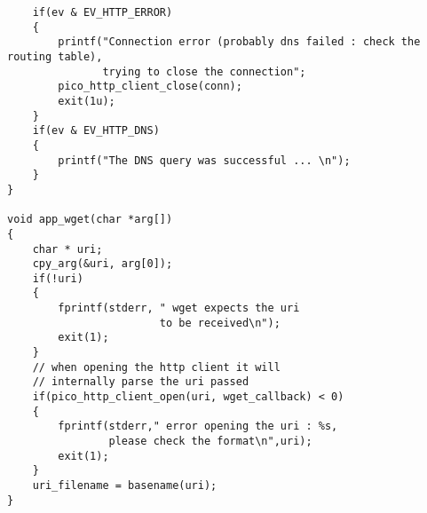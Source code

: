 \begin{verbatim}
    if(ev & EV_HTTP_ERROR)
    {
        printf("Connection error (probably dns failed : check the routing table),
               trying to close the connection";
        pico_http_client_close(conn);
        exit(1u);
    }
    if(ev & EV_HTTP_DNS)
    {
        printf("The DNS query was successful ... \n");
    }
}

void app_wget(char *arg[])
{
    char * uri;
    cpy_arg(&uri, arg[0]);
    if(!uri)
    {
        fprintf(stderr, " wget expects the uri
                        to be received\n");
        exit(1);
    }
    // when opening the http client it will
    // internally parse the uri passed
    if(pico_http_client_open(uri, wget_callback) < 0)
    {
        fprintf(stderr," error opening the uri : %s,
                please check the format\n",uri);
        exit(1);
    }
    uri_filename = basename(uri);
}
\end{verbatim}



